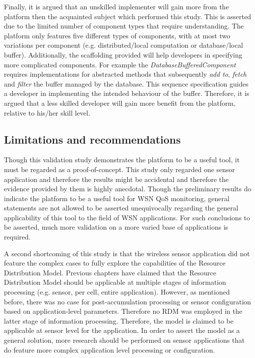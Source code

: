 Finally, it is argued that an unskilled implementer will gain more from the platform then the acquainted subject which performed this study. This is asserted due to the limited number of component types that require understanding. The platform only features five different types of components, with at most two variations per component (e.g. distributed/local computation or database/local buffer). Additionally, the scaffolding provided will help developers in specifying more complicated components. For example the \emph{DatabaseBufferedComponent} requires implementations for abstracted methods that subsequently \emph{add to}, \emph{fetch} and \emph{filter} the buffer managed by the database. This sequence specification guides a developer in implementing the intended behaviour of the buffer. Therefore, it is argued that a less skilled developer will gain more benefit from the platform, relative to his/her skill level.

\subsection{Limitations and recommendations}
Though this validation study demonstrates the platform to be a useful tool, it must be regarded as a proof-of-concept. This study only regarded one sensor application and therefore the results might be accidental and therefore the evidence provided by them is highly anecdotal. Though the preliminary results do indicate the platform to be a useful tool for WSN QoS monitoring, general statements are not allowed to be asserted unequivocally regarding the general applicability of this tool to the field of WSN applications. For such conclusions to be asserted, much more validation on a more varied base of applications is required.

A second shortcoming of this study is that the \sensit wireless sensor application did not feature the complex cases to fully explore the capabilities of the Resource Distribution Model. Previous chapters have claimed that the Resource Distribution Model should be applicable at multiple stages of information processing (e.g. sensor, per cell, entire application). However, as mentioned before, there was no case for post-accumulation processing or sensor configuration based on application-level parameters. Therefore no RDM was employed in the latter stage of information processing. Therefore, the model is claimed to be applicable at sensor level for the \sensit application. In order to assert the model as a general solution, more research should be performed on sensor applications that do feature more complex application level processing or configuration.

